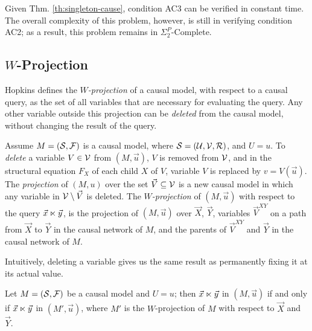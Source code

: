 Given Thm. \ref{th:singleton-cause}, condition AC3 can be verified
in constant time. The overall complexity of this problem, however, is
still in verifying condition AC2; as a result, this problem remains in 
$\Sigma_2^P$-Complete.

\subsection{\texorpdfstring
    {$W$-Projection}
    {\textit{W}-Projection}
}

Hopkins \cite{hopkins2002strategies} defines the \emph{$W$-projection}
of a causal model, with respect to a causal query, as the set of all 
variables that are necessary for evaluating the query. Any other
variable outside this projection can be \emph{deleted} from the causal
model, without changing the result of the query.

\begin{definition}\label{def:variable-deletion}
    {\color{gray} Assume $M=(\mathcal{S}, \mathcal{F})$ is a causal model, where 
    $\mathcal{S}=(\mathcal{U}, \mathcal{V}, \mathcal{R})$, and $U=u$.} To 
    \emph{delete} a variable $V \in \mathcal{V}$ from $(M,\vec{u})$, $V$ is 
    removed from $\mathcal{V}$, and in the structural equation $F_X$ of
    each child $X$ of $V$, variable $V$ is replaced by $v = V(\vec{u})$.
    The \emph{projection} of $(M, u)$ over the set
    $\vec{V} \subseteq \mathcal{V}$ is a new causal model in which
    any variable in $\mathcal{V} \setminus \vec{V}$ is deleted.
    The \emph{$W$-projection} of $(M,\vec{u})$ with respect to the query 
    $\vec{x} \ltimes \vec{y}$, is the projection of $(M,\vec{u})$
    over $\vec{X}$, $\vec{Y}$, variables $\vec{V}^{XY}$ on a path from
    $\vec{X}$ to $\vec{Y}$ in the causal network of $M$, and the parents of 
    $\vec{V}^{XY}$ and $\vec{Y}$ in the causal network of $M$.
\end{definition}

Intuitively, deleting a variable gives us the same result as
permanently fixing it at its actual value.

\begin{theorem}
    {\color{gray}Let $M=(\mathcal{S}, \mathcal{F})$ be a causal model and $U=u$; then}
    $\vec{x} \ltimes \vec{y}$ in $(M,\vec{u})$ if and only if 
    $\vec{x} \ltimes \vec{y}$ in $(M',\vec{u})$, where $M'$ is the
    $W$-projection of $M$ with respect to $\vec{X}$ and $\vec{Y}$.
\end{theorem}


